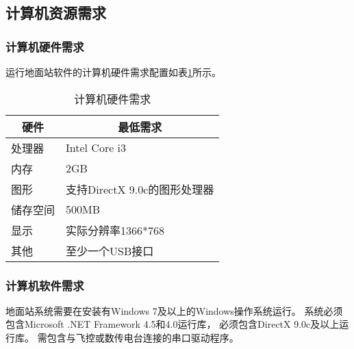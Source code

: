 \subsection{计算机资源需求}
\subsubsection{计算机硬件需求}
运行地面站软件的计算机硬件需求配置如表\ref{t3req}所示。
\begin{table}[ht]
\centering
\caption{计算机硬件需求}
\label{t3req}
\begin{tabular}{|l|l|}
\hline
\multicolumn{1}{|c|}{硬件} & \multicolumn{1}{c|}{最低需求} \\ \hline
处理器                      & Intel Core i3             \\ \hline
内存                       & 2GB                        \\ \hline
图形                       & 支持DirectX 9.0c的图形处理器      \\ \hline
储存空间                     & 500MB                     \\ \hline
显示                       & 实际分辨率1366*768                  \\ \hline
其他                       & 至少一个USB接口                 \\ \hline
\end{tabular}
\end{table}


\subsubsection{计算机软件需求}
地面站系统需要在安装有Windows 7及以上的Windows操作系统运行。
系统必须包含Microsoft .NET Framework 4.5和4.0运行库，
必须包含DirectX 9.0c及以上运行库。
需包含与飞控或数传电台连接的串口驱动程序。

\endinput